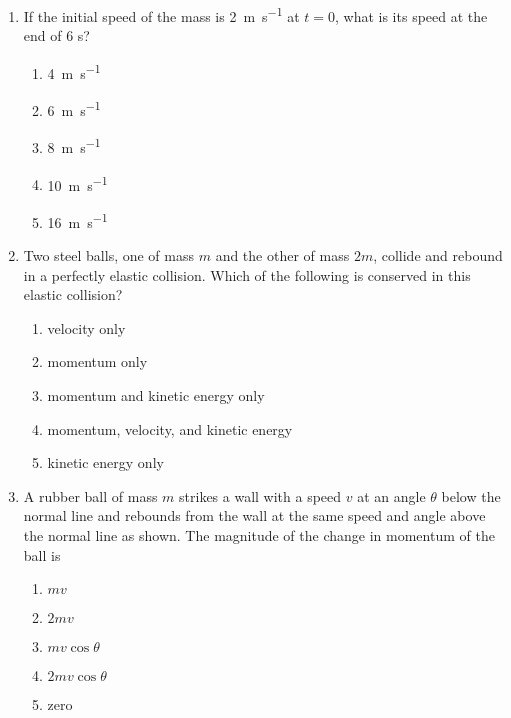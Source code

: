 \documentclass{../../../oss-apphys}
\begin{document}
\begin{multicols}{2}
\begin{enumerate}[leftmargin=18pt,resume]
  \item If the initial speed of the mass is \SI{2}{\metre\per\second} at $t=0$,
    what is its speed at the end of 6 s?
    \label{impulse2}
    \begin{enumerate}[nosep,leftmargin=18pt,label=(\Alph*)]
    \item\SI{4}{\metre\per\second}
    \item\SI{6}{\metre\per\second}
    \item\SI{8}{\metre\per\second}
    \item\SI{10}{\metre\per\second}
    \item\SI{16}{\metre\per\second}
    \end{enumerate}
    \columnbreak
    
  \item Two steel balls, one of mass $m$ and the other of mass $2m$, collide and
    rebound in a perfectly elastic collision. Which of the following is
    conserved in this elastic collision?
    \begin{enumerate}[nosep,leftmargin=18pt,label=(\Alph*)]
    \item velocity only
    \item momentum only
    \item momentum and kinetic energy only
    \item momentum, velocity, and kinetic energy
    \item kinetic energy only
    \end{enumerate}
    \vspace{.8in}
    
  \item A rubber ball of mass $m$ strikes a wall with a speed $v$ at an angle
    $\theta$ below the normal line and rebounds from the wall at the same speed
    and angle above the normal line as shown. The magnitude of the change in
    momentum of the ball is
    \begin{center}
    \end{center}
    \begin{enumerate}[nosep,leftmargin=18pt,label=(\Alph*)]
    \item $mv$
    \item $2mv$
    \item $mv\cos\theta$
    \item $2mv\cos\theta$
    \item  zero
    \end{enumerate}
    \columnbreak
    

\end{enumerate}
\end{multicols}
\end{document}
